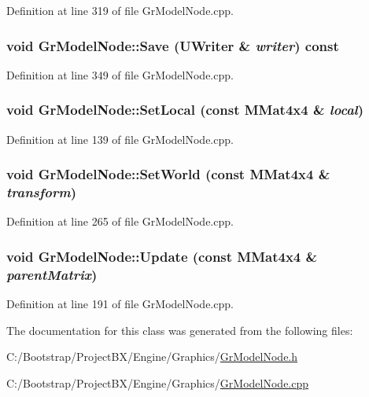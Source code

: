 Definition at line 319 of file GrModelNode.cpp.\hypertarget{class_gr_model_node_5232522d893c1b123115f95a6e1b1a7a}{
\subsubsection[{Save}]{\setlength{\rightskip}{0pt plus 5cm}void GrModelNode::Save ({\bf UWriter} \& {\em writer}) const}}
\label{class_gr_model_node_5232522d893c1b123115f95a6e1b1a7a}




Definition at line 349 of file GrModelNode.cpp.\hypertarget{class_gr_model_node_1de0741bd0fbf78cb7ef6802948b6080}{
\subsubsection[{SetLocal}]{\setlength{\rightskip}{0pt plus 5cm}void GrModelNode::SetLocal (const {\bf MMat4x4} \& {\em local})}}
\label{class_gr_model_node_1de0741bd0fbf78cb7ef6802948b6080}




Definition at line 139 of file GrModelNode.cpp.\hypertarget{class_gr_model_node_65acb56567cf1c21de6124a9e3ef0b71}{
\subsubsection[{SetWorld}]{\setlength{\rightskip}{0pt plus 5cm}void GrModelNode::SetWorld (const {\bf MMat4x4} \& {\em transform})}}
\label{class_gr_model_node_65acb56567cf1c21de6124a9e3ef0b71}




Definition at line 265 of file GrModelNode.cpp.\hypertarget{class_gr_model_node_c5c58f7cd659b01c66e0f45054cd6200}{
\subsubsection[{Update}]{\setlength{\rightskip}{0pt plus 5cm}void GrModelNode::Update (const {\bf MMat4x4} \& {\em parentMatrix})}}
\label{class_gr_model_node_c5c58f7cd659b01c66e0f45054cd6200}




Definition at line 191 of file GrModelNode.cpp.

The documentation for this class was generated from the following files:\begin{CompactItemize}
\item 
C:/Bootstrap/ProjectBX/Engine/Graphics/\hyperlink{_gr_model_node_8h}{GrModelNode.h}\item 
C:/Bootstrap/ProjectBX/Engine/Graphics/\hyperlink{_gr_model_node_8cpp}{GrModelNode.cpp}\end{CompactItemize}
